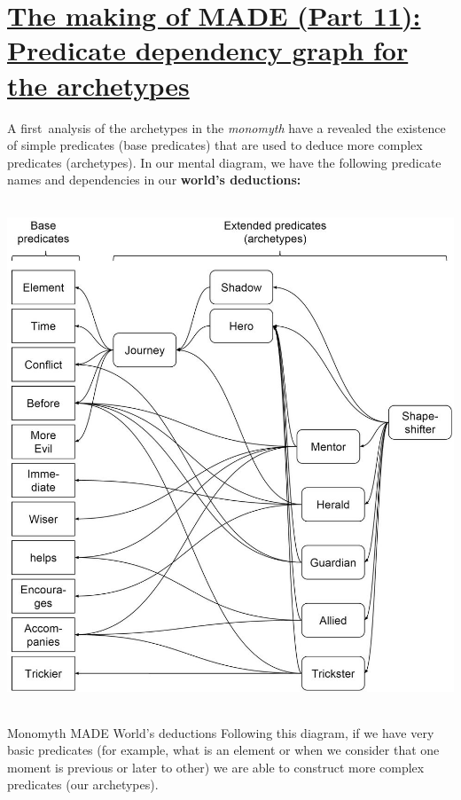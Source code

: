 \documentclass[a4paper]{article}
\newcommand\textstyleStrongEmphasis[1]{\textbf{#1}}
\newcommand\textstyleEmphasis[1]{\textit{#1}}
\begin{document}
\bigskip

\clearpage\section[The making of MADE (Part 11): Predicate dependency
graph for the
archetypes]{\href{http://www.velonuboso.com/made/2015/07/18/making-part-11-predicate-dependency-graph-archetypes/}{The
making of MADE (Part 11): Predicate dependency graph for the
archetypes}}
A first~analysis of the archetypes in the \textstyleEmphasis{monomyth}
have a revealed the existence of simple predicates (base predicates)
that are used to deduce more complex predicates (archetypes). In our
mental diagram, we have the following predicate names and dependencies
in our \textstyleStrongEmphasis{world{\textquoteright}s deductions:}

\href{http://www.velonuboso.com/made/blog/wp-content/uploads/2015/07/descarga.jpg}{
\includegraphics[width=14.229cm,height=15.109cm]{makingofmade113-img16.jpg}
}

Monomyth MADE World{\textquoteright}s deductions
Following this diagram, if we have very basic predicates (for example,
what is an element or when we consider that one moment is previous or
later to other) we are able to construct more complex predicates (our
archetypes).
\end{document}
